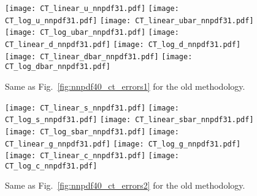 \begin{figure}[ht]
    \centering
    \texttt{[image: CT\_linear\_u\_nnpdf31.pdf]}
    \texttt{[image: CT\_log\_u\_nnpdf31.pdf]}
    \texttt{[image: CT\_linear\_ubar\_nnpdf31.pdf]}
    \texttt{[image: CT\_log\_ubar\_nnpdf31.pdf]}
    \texttt{[image: CT\_linear\_d\_nnpdf31.pdf]}
    \texttt{[image: CT\_log\_d\_nnpdf31.pdf]}
    \texttt{[image: CT\_linear\_dbar\_nnpdf31.pdf]}
    \texttt{[image: CT\_log\_dbar\_nnpdf31.pdf]}
    \caption{Same as Fig.~\ref{fig:nnpdf40_ct_errors1} for the old methodology.}
    \label{fig:nnpdf31_ct_errors1}    
\end{figure}

\begin{figure}[ht]
    \centering
    \texttt{[image: CT\_linear\_s\_nnpdf31.pdf]}
    \texttt{[image: CT\_log\_s\_nnpdf31.pdf]}
    \texttt{[image: CT\_linear\_sbar\_nnpdf31.pdf]}
    \texttt{[image: CT\_log\_sbar\_nnpdf31.pdf]}
    \texttt{[image: CT\_linear\_g\_nnpdf31.pdf]}
    \texttt{[image: CT\_log\_g\_nnpdf31.pdf]}
    \texttt{[image: CT\_linear\_c\_nnpdf31.pdf]}
    \texttt{[image: CT\_log\_c\_nnpdf31.pdf]}
    \caption{Same as Fig.~\ref{fig:nnpdf40_ct_errors2} for the old methodology.}
    \label{fig:nnpdf31_ct_errors2}    
\end{figure}
\fi
